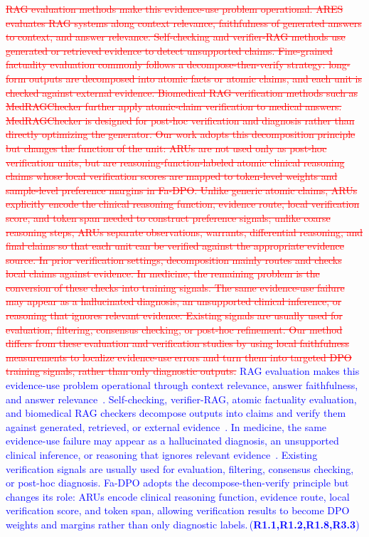 \documentclass[a4paper,fleqn,doubleblind]{cas-sc}
\DeclareRobustCommand{\deleted}[1]{\textcolor{red}{\sout{#1}}}
\DeclareRobustCommand{\added}[1]{\textcolor{blue}{#1}}
\DeclareRobustCommand{\revtag}[1]{\textcolor{blue}{\scriptsize\,(\textbf{#1})}}
\begin{document}
\deleted{RAG evaluation methods make this evidence-use problem operational. ARES evaluates RAG systems along context relevance, faithfulness of generated answers to context, and answer relevance. Self-checking and verifier-RAG methods use generated or retrieved evidence to detect unsupported claims. Fine-grained factuality evaluation commonly follows a decompose-then-verify strategy: long-form outputs are decomposed into atomic facts or atomic claims, and each unit is checked against external evidence. Biomedical RAG verification methods such as MedRAGChecker further apply atomic-claim verification to medical answers. MedRAGChecker is designed for post-hoc verification and diagnosis rather than directly optimizing the generator. Our work adopts this decomposition principle but changes the function of the unit: ARUs are not used only as post-hoc verification units, but are reasoning-function-labeled atomic clinical reasoning claims whose local verification scores are mapped to token-level weights and sample-level preference margins in Fa-DPO. Unlike generic atomic claims, ARUs explicitly encode the clinical reasoning function, evidence route, local verification score, and token span needed to construct preference signals; unlike coarse reasoning steps, ARUs separate observations, warrants, differential reasoning, and final claims so that each unit can be verified against the appropriate evidence source. In prior verification settings, decomposition mainly routes and checks local claims against evidence. In medicine, the remaining problem is the conversion of these checks into training signals. The same evidence-use failure may appear as a hallucinated diagnosis, an unsupported clinical inference, or reasoning that ignores relevant evidence. Existing signals are usually used for evaluation, filtering, consensus checking, or post-hoc refinement. Our method differs from these evaluation and verification studies by using local faithfulness measurements to localize evidence-use errors and turn them into targeted DPO training signals, rather than only diagnostic outputs.}
\added{RAG evaluation makes this evidence-use problem operational through context relevance, answer faithfulness, and answer relevance~\cite{saadfalcon2024ares}. Self-checking, verifier-RAG, atomic factuality evaluation, and biomedical RAG checkers decompose outputs into claims and verify them against generated, retrieved, or external evidence~\cite{manakul2023selfcheckgpt, phasook2025vereafine, min-etal-2023-factscore, wei2024longform, song-etal-2024-veriscore, ji2026medragchecker}. In medicine, the same evidence-use failure may appear as a hallucinated diagnosis, an unsupported clinical inference, or reasoning that ignores relevant evidence~\cite{li2023hallucination, ji2023survey}. Existing verification signals are usually used for evaluation, filtering, consensus checking, or post-hoc diagnosis. Fa-DPO adopts the decompose-then-verify principle but changes its role: ARUs encode clinical reasoning function, evidence route, local verification score, and token span, allowing verification results to become DPO weights and margins rather than only diagnostic labels.}\revtag{R1.1,R1.2,R1.8,R3.3}
\end{document}
